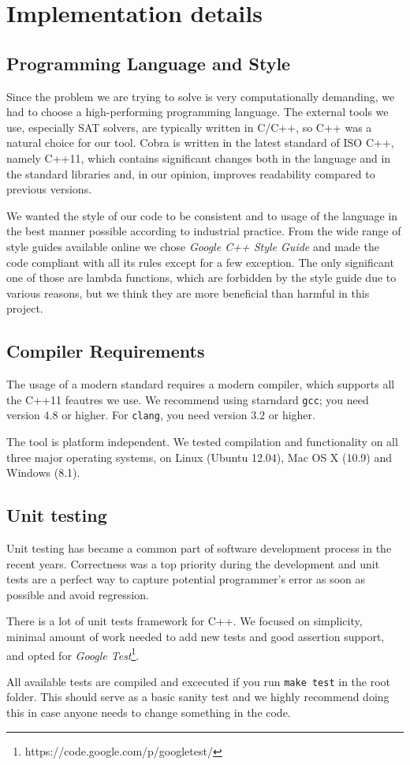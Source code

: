\section{Implementation details}

\subsection{Programming Language and Style}

Since the problem we are trying to solve is very computationally demanding,
  we had to choose a high-performing programming language.
The external tools we use, especially SAT solvers, are typically written in C/C++,
  so C++ was a natural choice for our tool.
Cobra is written in the latest standard of ISO C++, namely C++11, which
  contains significant changes both in the language and in the standard libraries
  and, in our opinion, improves readability compared to previous versions.

We wanted the style of our code to be consistent and to usage of the language in the best
 manner possible according to industrial practice.
From the wide range of style guides available online
 we chose \emph{Google C++ Style Guide}\cite{google-style} and made
 the code compliant with all its rules except for a few exception.
The only significant one of those are lambda functions, which are forbidden
 by the style guide due to various reasons,
 but we think they are more beneficial than harmful in this project.

\subsection{Compiler Requirements}
The usage of a modern standard requires a modern compiler,
  which supports all the C++11 feautres we use.
We recommend using starndard \texttt{gcc}; you need version $4.8$ or higher.
For \texttt{clang}, you need version $3.2$ or higher.

The tool is platform independent.
  We tested compilation and functionality on
  all three major operating systems, on Linux (Ubuntu 12.04),
  Mac OS X (10.9) and Windows (8.1).

\subsection{Unit testing}
Unit testing has became a common part of software development process
  in the recent years.
Correctness was a top priority during the development and
  unit tests are a perfect way to capture potential programmer's error
  as soon as possible and avoid regression.

There is a lot of unit tests framework for C++.
We focused on simplicity, minimal amount of work needed to add new tests
  and good assertion support, and opted for
  \emph{Google Test}\footnote{https://code.google.com/p/googletest/}.

All available tests are compiled and excecuted if you run \texttt{make test}
  in the root folder.
This should serve as a basic sanity test and we highly recommend
  doing this in case anyone needs to change something in the code.

